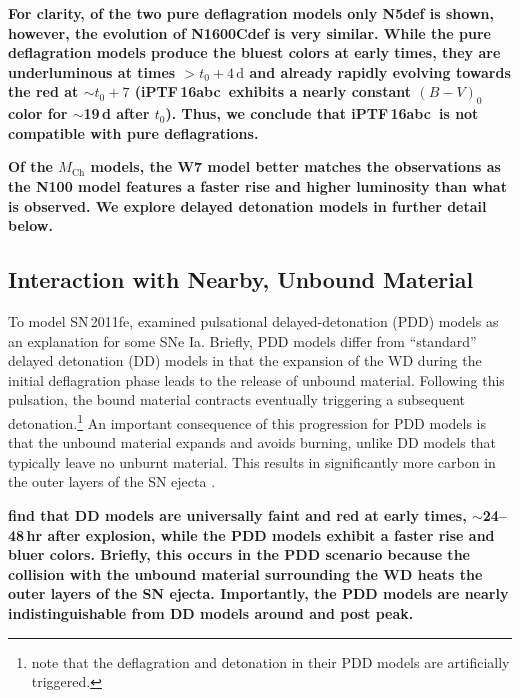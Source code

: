\documentclass[twocolumn]{aastex61}
\newcommand{\abc}{iPTF\,16abc}
\begin{document}
\textbf{For clarity, of the two pure deflagration models only N5def is shown,
however, the evolution of N1600Cdef is very similar. While the pure
deflagration models produce the bluest colors at early times, they are
underluminous at times $> t_0 + 4\,\mathrm{d}$ and already rapidly evolving
towards the red at $\sim$$t_0 + 7$ (\abc\ exhibits a nearly constant $(B-V)_0$
color for $\sim$19\,d after $t_0$). Thus, we conclude that \abc\ is not
compatible with pure deflagrations.}

\textbf{Of the $M_\mathrm{Ch}$ models, the W7 model better matches the
observations as the N100 model features a faster rise and higher luminosity
than what is observed. We explore delayed detonation models in further detail
below.}

\subsection{Interaction with \textbf{Nearby, Unbound} Material}

To model SN\,2011fe, \citet{2014MNRAS.441..532D} examined
pulsational delayed-detonation (PDD) models as an explanation for some SNe
Ia. Briefly, PDD models differ from ``standard'' delayed detonation (DD)
models in that the expansion of the WD during the initial deflagration
phase leads to the release of unbound material. Following this pulsation,
the bound material contracts eventually triggering a subsequent
detonation.\footnote{\citet{2014MNRAS.441..532D} note that the deflagration
and detonation in their PDD models are artificially triggered.} An
important consequence of this progression for PDD models is that the
unbound material expands and avoids burning, unlike DD models that
typically leave no unburnt material. This results in significantly more
carbon in the outer layers of the SN ejecta \citep{2014MNRAS.441..532D}.

\textbf{\citet{2014MNRAS.441..532D} find that DD models are universally faint and red at early times, $\sim$24--48\,hr after explosion, while the PDD models exhibit a faster rise and bluer colors. Briefly, this occurs in the PDD scenario because the collision with the unbound material surrounding the WD heats the outer layers of the SN ejecta. Importantly, the PDD models are nearly indistinguishable from DD models around and post peak.}
\end{document}

